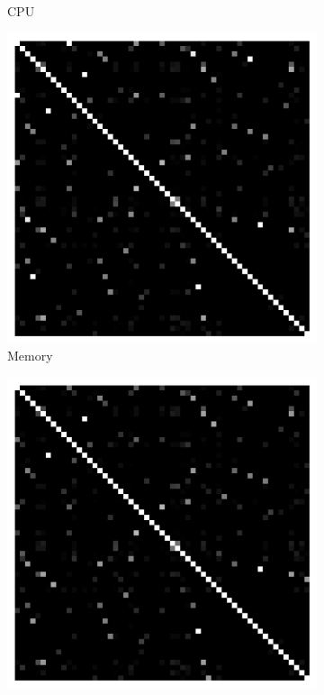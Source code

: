 \begin{figure}[t]
\begin{subfigure}{0.19\textwidth}
                \caption{CPU}
        \end{subfigure}%
        \begin{subfigure}{0.19\textwidth}
                \includegraphics[width=\linewidth]{Figures/cassandra-mem-commitX.pdf}
                \caption{Memory}
        \end{subfigure}%
        \begin{subfigure}{0.19\textwidth}
                \includegraphics[width=\linewidth]{Figures/cassandra-ioread-commitX.pdf}

\end{subfigure}
\end{figure}
